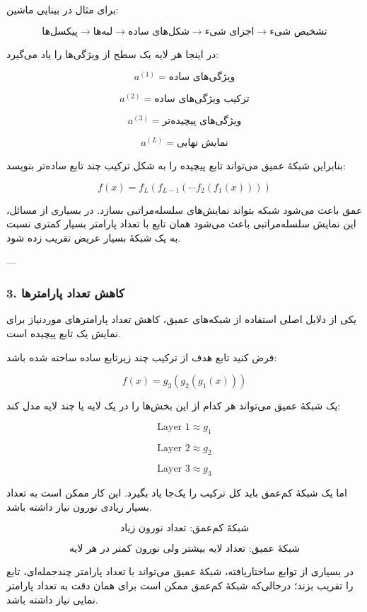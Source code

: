 \documentclass[12pt,a4paper]{article}
\begin{document}
برای مثال در بینایی ماشین:

\[
\text{پیکسل‌ها}
\rightarrow
\text{لبه‌ها}
\rightarrow
\text{شکل‌های ساده}
\rightarrow
\text{اجزای شیء}
\rightarrow
\text{تشخیص شیء}
\]

در اینجا هر لایه یک سطح از ویژگی‌ها را یاد می‌گیرد:

\[
a^{(1)} = \text{ویژگی‌های ساده}
\]

\[
a^{(2)} = \text{ترکیب ویژگی‌های ساده}
\]

\[
a^{(3)} = \text{ویژگی‌های پیچیده‌تر}
\]

\[
a^{(L)} = \text{نمایش نهایی}
\]

بنابراین شبکهٔ عمیق می‌تواند تابع پیچیده را به شکل ترکیب چند تابع ساده‌تر بنویسد:

\[
f(x)=f_L(f_{L-1}(\cdots f_2(f_1(x))))
\]

\begin{tcolorbox}[
	colback=softgreen,
	colframe=mygreen,
	title=مزیت بیان‌پذیری عمق
	]
	عمق باعث می‌شود شبکه بتواند نمایش‌های سلسله‌مراتبی بسازد. در بسیاری از مسائل، این نمایش سلسله‌مراتبی باعث می‌شود همان تابع با تعداد پارامتر بسیار کمتری نسبت به یک شبکهٔ بسیار عریض تقریب زده شود.
\end{tcolorbox}

---

\subsubsection{3. کاهش تعداد پارامترها}

یکی از دلایل اصلی استفاده از شبکه‌های عمیق، کاهش تعداد پارامترهای موردنیاز برای نمایش یک تابع پیچیده است.

فرض کنید تابع هدف از ترکیب چند زیرتابع ساده ساخته شده باشد:

\[
f(x)=g_3(g_2(g_1(x)))
\]

یک شبکهٔ عمیق می‌تواند هر کدام از این بخش‌ها را در یک لایه یا چند لایه مدل کند:

\[
\text{Layer 1} \approx g_1
\]

\[
\text{Layer 2} \approx g_2
\]

\[
\text{Layer 3} \approx g_3
\]

اما یک شبکهٔ کم‌عمق باید کل ترکیب را یک‌جا یاد بگیرد. این کار ممکن است به تعداد بسیار زیادی نورون نیاز داشته باشد.

\[
\text{شبکهٔ کم‌عمق: تعداد نورون زیاد}
\]

\[
\text{شبکهٔ عمیق: تعداد لایه بیشتر ولی نورون کمتر در هر لایه}
\]

\begin{tcolorbox}[
	colback=lightblue,
	colframe=mainblue,
	title=مقایسهٔ تعداد پارامترها
	]
	در بسیاری از توابع ساختاریافته، شبکهٔ عمیق می‌تواند با تعداد پارامتر چندجمله‌ای، تابع را تقریب بزند؛ درحالی‌که شبکهٔ کم‌عمق ممکن است برای همان دقت به تعداد پارامتر نمایی نیاز داشته باشد.
\end{tcolorbox}
\end{document}
